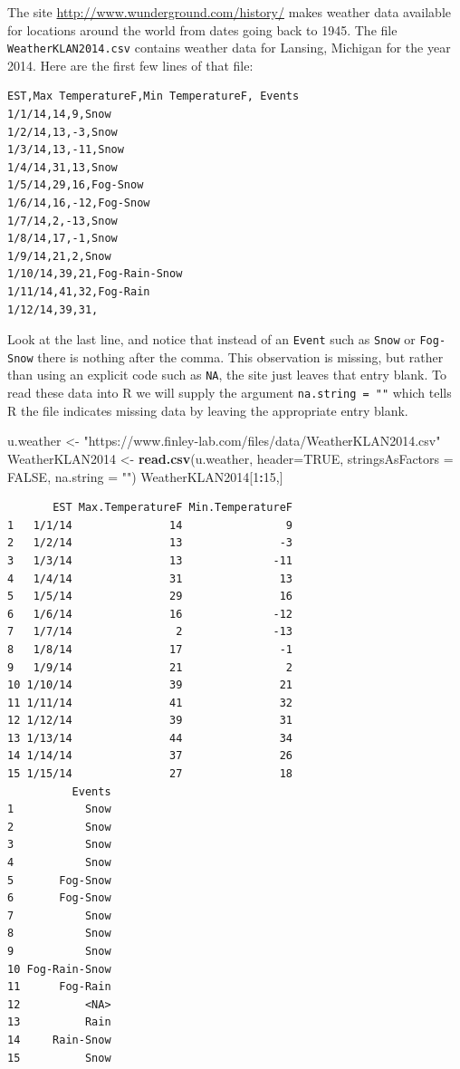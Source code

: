\documentclass[
]{krantz}
\makeatletter
\newenvironment{Shaded}{\begin{snugshade}}{\end{snugshade}}
\newcommand{\DataTypeTok}[1]{\textcolor[rgb]{0.27,0.27,0.27}{#1}}
\newcommand{\DecValTok}[1]{\textcolor[rgb]{0.06,0.06,0.06}{#1}}
\newcommand{\KeywordTok}[1]{\textcolor[rgb]{0.27,0.27,0.27}{\textbf{#1}}}
\newcommand{\NormalTok}[1]{#1}
\newcommand{\OperatorTok}[1]{\textcolor[rgb]{0.43,0.43,0.43}{\textbf{#1}}}
\newcommand{\OtherTok}[1]{\textcolor[rgb]{0.37,0.37,0.37}{#1}}
\newcommand{\StringTok}[1]{\textcolor[rgb]{0.5,0.5,0.5}{#1}}
\newenvironment{kframe}{%
\medskip{}
\setlength{\fboxsep}{.8em}
 \def\at@end@of@kframe{}%
 \ifinner\ifhmode%
  \def\at@end@of@kframe{\end{minipage}}%
  \begin{minipage}{\columnwidth}%
 \fi\fi%
 \def\FrameCommand##1{\hskip\@totalleftmargin \hskip-\fboxsep
 \colorbox{shadecolor}{##1}\hskip-\fboxsep
     \hskip-\linewidth \hskip-\@totalleftmargin \hskip\columnwidth}%
 \MakeFramed {\advance\hsize-\width
   \@totalleftmargin\z@ \linewidth\hsize
   \@setminipage}}%
 {\par\unskip\endMakeFramed%
 \at@end@of@kframe}
\renewenvironment{Shaded}{\begin{kframe}}{\end{kframe}}
\makeatother
\begin{document}
The site \url{http://www.wunderground.com/history/} makes weather data available for locations around the world from dates going back to 1945. The file \texttt{WeatherKLAN2014.csv} contains weather data for Lansing, Michigan for the year 2014. Here are the first few lines of that file:

\begin{verbatim}
EST,Max TemperatureF,Min TemperatureF, Events
1/1/14,14,9,Snow
1/2/14,13,-3,Snow
1/3/14,13,-11,Snow
1/4/14,31,13,Snow
1/5/14,29,16,Fog-Snow
1/6/14,16,-12,Fog-Snow
1/7/14,2,-13,Snow
1/8/14,17,-1,Snow
1/9/14,21,2,Snow
1/10/14,39,21,Fog-Rain-Snow
1/11/14,41,32,Fog-Rain
1/12/14,39,31,
\end{verbatim}

Look at the last line, and notice that instead of an \texttt{Event} such as \texttt{Snow} or \texttt{Fog-Snow} there is nothing after the comma. This observation is missing, but rather than using an explicit code such as \texttt{NA}, the site just leaves that entry blank. To read these data into R we will supply the argument \texttt{na.string\ =\ ""} which tells R the file indicates missing data by leaving the appropriate entry blank.

\begin{Shaded}
\begin{Highlighting}[]
\NormalTok{u.weather \textless{}{-}}\StringTok{ "https://www.finley{-}lab.com/files/data/WeatherKLAN2014.csv"}
\NormalTok{WeatherKLAN2014 \textless{}{-}}\StringTok{ }\KeywordTok{read.csv}\NormalTok{(u.weather, }\DataTypeTok{header=}\OtherTok{TRUE}\NormalTok{, }
                            \DataTypeTok{stringsAsFactors =} \OtherTok{FALSE}\NormalTok{, }\DataTypeTok{na.string =} \StringTok{""}\NormalTok{)}
\NormalTok{WeatherKLAN2014[}\DecValTok{1}\OperatorTok{:}\DecValTok{15}\NormalTok{,]}
\end{Highlighting}
\end{Shaded}

\begin{verbatim}
       EST Max.TemperatureF Min.TemperatureF
1   1/1/14               14                9
2   1/2/14               13               -3
3   1/3/14               13              -11
4   1/4/14               31               13
5   1/5/14               29               16
6   1/6/14               16              -12
7   1/7/14                2              -13
8   1/8/14               17               -1
9   1/9/14               21                2
10 1/10/14               39               21
11 1/11/14               41               32
12 1/12/14               39               31
13 1/13/14               44               34
14 1/14/14               37               26
15 1/15/14               27               18
          Events
1           Snow
2           Snow
3           Snow
4           Snow
5       Fog-Snow
6       Fog-Snow
7           Snow
8           Snow
9           Snow
10 Fog-Rain-Snow
11      Fog-Rain
12          <NA>
13          Rain
14     Rain-Snow
15          Snow
\end{verbatim}
\end{document}
